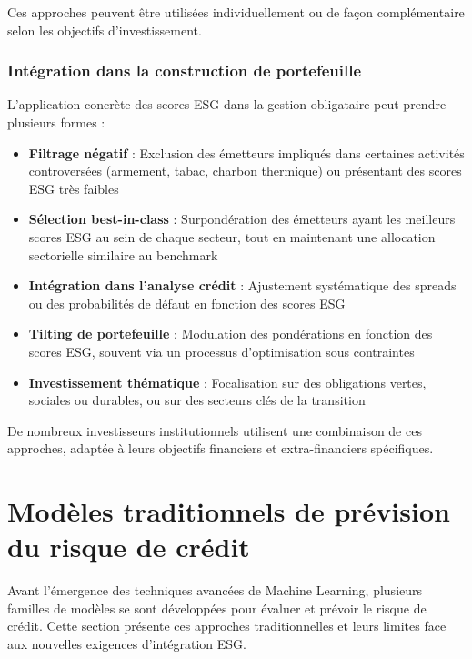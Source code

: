 Ces approches peuvent être utilisées individuellement ou de façon complémentaire selon les objectifs d'investissement.

\subsubsection{Intégration dans la construction de portefeuille}

L'application concrète des scores ESG dans la gestion obligataire peut prendre plusieurs formes :

\begin{itemize}
    \item \textbf{Filtrage négatif} : Exclusion des émetteurs impliqués dans certaines activités controversées (armement, tabac, charbon thermique) ou présentant des scores ESG très faibles
    
    \item \textbf{Sélection best-in-class} : Surpondération des émetteurs ayant les meilleurs scores ESG au sein de chaque secteur, tout en maintenant une allocation sectorielle similaire au benchmark
    
    \item \textbf{Intégration dans l'analyse crédit} : Ajustement systématique des spreads ou des probabilités de défaut en fonction des scores ESG
    
    \item \textbf{Tilting de portefeuille} : Modulation des pondérations en fonction des scores ESG, souvent via un processus d'optimisation sous contraintes
    
    \item \textbf{Investissement thématique} : Focalisation sur des obligations vertes, sociales ou durables, ou sur des secteurs clés de la transition
\end{itemize}

De nombreux investisseurs institutionnels utilisent une combinaison de ces approches, adaptée à leurs objectifs financiers et extra-financiers spécifiques.

\section{Modèles traditionnels de prévision du risque de crédit}

Avant l'émergence des techniques avancées de Machine Learning, plusieurs familles de modèles se sont développées pour évaluer et prévoir le risque de crédit. Cette section présente ces approches traditionnelles et leurs limites face aux nouvelles exigences d'intégration ESG.

